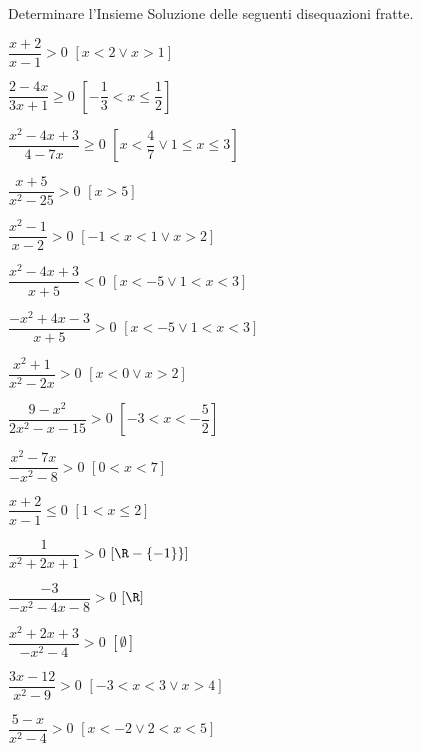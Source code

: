 
\begin{esercizio}[*]
 \label{ese:4.58}
Determinare l'Insieme Soluzione delle seguenti disequazioni fratte.
\begin{htmulticols}{2}
\begin{enumeratea}
\item \(\dfrac{x+2}{x-1}>0\) \hfill \(\left[x<2\vee x>1\right]\)
\item \(\dfrac{2-4x}{3x+1}\ge 0\) \hfill \(\left[-\dfrac 1 3<x\le \dfrac 1 
2\right]\)
\item \(\dfrac{x^2-4x+3}{4-7x}\ge 0\) 
 \hfill \(\left[x<\dfrac 4 7\vee 1\le x\le 3\right]\)
\item \(\dfrac{x+5}{x^2-25}>0\) \hfill \(\left[x>5\right]\)
\item \(\dfrac{x^2-1}{x-2}>0\) \hfill \(\left[-1<x<1\vee x>2\right]\)
\item \(\dfrac{x^2-4x+3}{x+5}<0\) \hfill \(\left[x<-5\vee 1<x<3\right]\)
\item \(\dfrac{-x^2+4x-3}{x+5}>0\) \hfill \(\left[x<-5\vee 1<x<3\right]\)
\item \(\dfrac{x^2+1}{x^2-2x}>0\) \hfill \(\left[x<0\vee x>2\right]\)
\item \(\dfrac{9-x^2}{2x^2-x-15}>0\) \hfill \(\left[-3<x<-\dfrac 5 2\right]\)
\item \(\dfrac{x^2-7x}{-x^2-8}>0\) \hfill \(\left[0<x<7\right]\)
\item \(\dfrac{x+2}{x-1}\le 0\) \hfill \(\left[1< x\le 2\right]\)
\item \(\dfrac 1{x^2+2x+1}>0\) \hfill \(\left[\R-\{-1\}\}\right]\)
\item \(\dfrac{-3}{-x^2-4x-8}>0\) \hfill \(\left[\R\right]\)
\item \(\dfrac{x^2+2x+3}{-x^2-4}>0\) \hfill \(\left[\emptyset\right]\)
\item \(\dfrac{3x-12}{x^2-9}>0\) \hfill \(\left[-3<x<3\vee x>4\right]\)
\item \(\dfrac{5-x}{x^2-4}>0\) \hfill \(\left[x<-2\vee 2<x<5\right]\)
\end{enumeratea}
\end{htmulticols}
\end{esercizio}

